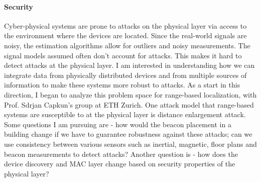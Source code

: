 \documentclass[10pt]{article}
\begin{document}

\paragraph{Security}
Cyber-physical systems are prone to attacks on the physical layer via
access to the environment where the devices are located.  Since the
real-world signals are noisy, the estimation algorithms allow for
outliers and noisy measurements. The signal models assumed often don't
account for attacks. This makes it hard to detect attacks at the
physical layer. I am interested in understanding how we can integrate
data from physically distributed devices and from multiple sources of
information to make these systems more robust to attacks. As a start
in this direction, I began to analyze this problem space for
range-based localization, with Prof. Sdrjan Capkun's group at ETH
Zurich. One attack model that range-based systems are susceptible to
at the physical layer is distance enlargement attack. Some questions I
am pursuing are - how would the beacon placement in a building change
if we have to guarantee robustness against these attacks; can we use
consistency between various sensors such as inertial, magnetic, floor
plans and beacon measurements to detect attacks? Another question is -
how does the device discovery and MAC layer change based on security
properties of the physical layer?


\end{document}

